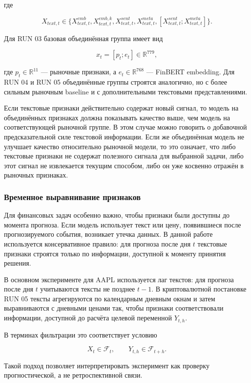 где

\[
X_{text,t} \in \{X_{text,t}^{emb}, X_{text,t}^{emb,k}, X_{text,t}^{sent}, X_{text,t}^{meta}, [X_{text,t}^{sent};X_{text,t}^{meta}]\}.
\]

Для RUN 03 базовая объединённая группа имеет вид

\[
x_t = [p_t; e_t] \in \mathbb{R}^{779},
\]

где $p_t \in \mathbb{R}^{11}$ --- рыночные признаки, а $e_t \in \mathbb{R}^{768}$ --- FinBERT embedding. Для RUN 04 и RUN 05 объединённые группы строятся аналогично, но с более сильным рыночным baseline и с дополнительными текстовыми представлениями.

Если текстовые признаки действительно содержат новый сигнал, то модель на объединённых признаках должна показывать качество выше, чем модель на соответствующей рыночной группе. В этом случае можно говорить о добавочной предсказательной силе текстовой информации. Если же объединённая модель не улучшает качество относительно рыночной модели, то это означает, что либо текстовые признаки не содержат полезного сигнала для выбранной задачи, либо этот сигнал не извлекается текущим способом, либо он уже косвенно отражён в рыночных признаках.

\subsubsection{Временное выравнивание признаков}

Для финансовых задач особенно важно, чтобы признаки были доступны до момента прогноза. Если модель использует текст или цену, появившиеся после прогнозируемого события, возникает утечка данных. В данной работе используется консервативное правило: для прогноза после дня $t$ текстовые признаки строятся только по информации, доступной к моменту принятия решения.

В основном эксперименте для AAPL используется лаг текстов: для прогноза после дня $t$ учитываются тексты не позднее $t-1$. В криптовалютной постановке RUN 05 тексты агрегируются по календарным дневным окнам и затем выравниваются с дневными ценами так, чтобы признаки соответствовали информации, доступной до расчёта целевой переменной $Y_{t,h}$.

В терминах фильтрации это соответствует условию

\[
X_t \in \mathcal{F}_t, \qquad Y_{t,h} \in \mathcal{F}_{t+h}.
\]

Такой подход позволяет интерпретировать эксперимент как проверку прогностической, а не ретроспективной связи.

